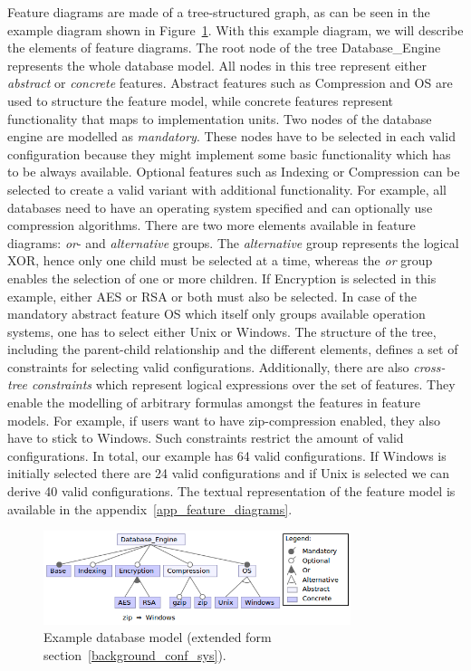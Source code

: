 Feature diagrams are made of a tree-structured graph, as can be seen in the example diagram shown in Figure~\ref{background_variab_models_feature_diagram_example}. 
With this example diagram, we will describe the elements of feature diagrams. 
The root node of the tree \textsf{Database\_Engine} represents the whole database model. 
All nodes in this tree represent either \textit{abstract} or \textit{concrete} features. 
Abstract features such as \textsf{Compression} and \textsf{OS} are used to structure the feature model, while concrete features represent functionality that maps to implementation units. 
Two nodes of the database engine are modelled as \textit{mandatory}. 
These nodes have to be selected in each valid configuration because they might implement some basic functionality which has to be always available. 
Optional features such as \textsf{Indexing} or \textsf{Compression} can be selected to create a valid variant with additional functionality.
For example, all databases need to have an operating system specified and can optionally use compression algorithms. 
There are two more elements available in feature diagrams: \textit{or}- and \textit{alternative} groups. 
The \textit{alternative} group represents the logical XOR, hence only one child must be selected at a time, whereas the \textit{or} group enables the selection of one or more children. 
If \textsf{Encryption} is selected in this example, either \textsf{AES} or \textsf{RSA} or both must also be selected. 
In case of the mandatory abstract feature \textsf{OS} which itself only groups available operation systems, one has to select either \textsf{Unix} or \textsf{Windows}. 
The structure of the tree, including the parent-child relationship and the different elements, defines a set of constraints for selecting valid configurations.
Additionally, there are also \textit{cross-tree constraints} which represent logical expressions over the set of features. 
They enable the modelling of arbitrary formulas amongst the features in feature models.
For example, if users want to have zip-compression enabled, they also have to stick to Windows. 
Such constraints restrict the amount of valid configurations. 
In total, our example has 64 valid configurations. 
If \textsf{Windows} is initially selected there are 24 valid configurations and if \textsf{Unix} is selected we can derive 40 valid configurations.
The textual representation of the feature model is available in the appendix~\ref{app_feature_diagrams}.

\begin{figure}
  \centering
  \includegraphics[width=0.8\textwidth]{images/example_database}
  \caption{Example database model (extended form section~\ref{background_conf_sys}).}
  \label{background_variab_models_feature_diagram_example}
\end{figure}

